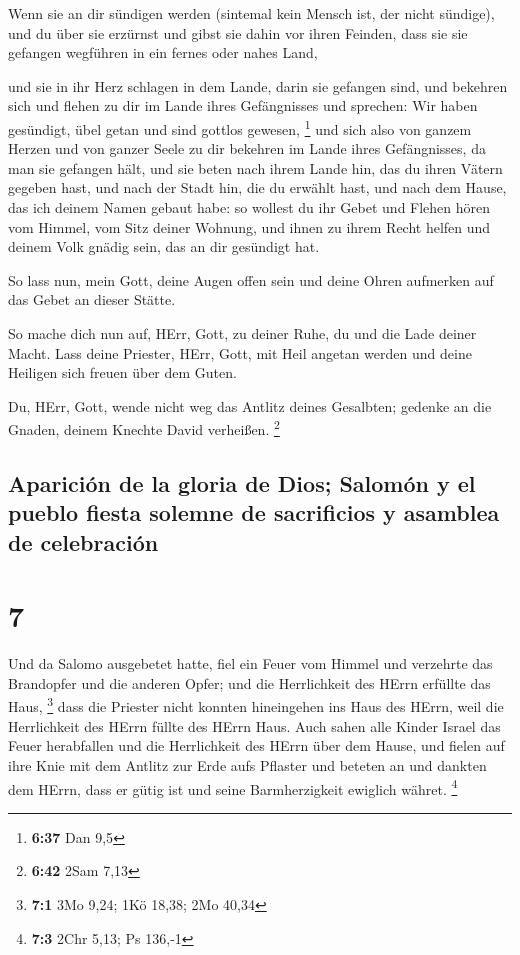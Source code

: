  Wenn sie an dir sündigen werden (sintemal kein Mensch
ist, der nicht sündige), und du über sie erzürnst und gibst sie dahin
vor ihren Feinden, dass sie sie gefangen wegführen in ein fernes oder
nahes Land,

 und sie in ihr Herz schlagen in dem Lande, darin sie
gefangen sind, und bekehren sich und flehen zu dir im Lande ihres
Gefängnisses und sprechen: Wir haben gesündigt, übel getan und sind
gottlos gewesen, \footnote{\textbf{6:37} Dan 9,5}  und
sich also von ganzem Herzen und von ganzer Seele zu dir bekehren im
Lande ihres Gefängnisses, da man sie gefangen hält, und sie beten nach
ihrem Lande hin, das du ihren Vätern gegeben hast, und nach der Stadt
hin, die du erwählt hast, und nach dem Hause, das ich deinem Namen
gebaut habe:  so wollest du ihr Gebet und Flehen hören
vom Himmel, vom Sitz deiner Wohnung, und ihnen zu ihrem Recht helfen und
deinem Volk gnädig sein, das an dir gesündigt hat.

 So lass nun, mein Gott, deine Augen offen sein und deine
Ohren aufmerken auf das Gebet an dieser Stätte.

 So mache dich nun auf, HErr, Gott, zu deiner Ruhe, du
und die Lade deiner Macht. Lass deine Priester, HErr, Gott, mit Heil
angetan werden und deine Heiligen sich freuen über dem Guten.

 Du, HErr, Gott, wende nicht weg das Antlitz deines
Gesalbten; gedenke an die Gnaden, deinem Knechte David verheißen.
\footnote{\textbf{6:42} 2Sam 7,13}

\hypertarget{apariciuxf3n-de-la-gloria-de-dios-salomuxf3n-y-el-pueblo-fiesta-solemne-de-sacrificios-y-asamblea-de-celebraciuxf3n}{%
\subsection{Aparición de la gloria de Dios; Salomón y el pueblo fiesta
solemne de sacrificios y asamblea de
celebración}\label{apariciuxf3n-de-la-gloria-de-dios-salomuxf3n-y-el-pueblo-fiesta-solemne-de-sacrificios-y-asamblea-de-celebraciuxf3n}}

\hypertarget{section-6}{%
\section{7}\label{section-6}}

 Und da Salomo ausgebetet hatte, fiel ein Feuer vom Himmel
und verzehrte das Brandopfer und die anderen Opfer; und die Herrlichkeit
des HErrn erfüllte das Haus, \footnote{\textbf{7:1} 3Mo 9,24; 1Kö 18,38;
  2Mo 40,34}  dass die Priester nicht konnten hineingehen
ins Haus des HErrn, weil die Herrlichkeit des HErrn füllte des HErrn
Haus.  Auch sahen alle Kinder Israel das Feuer herabfallen
und die Herrlichkeit des HErrn über dem Hause, und fielen auf ihre Knie
mit dem Antlitz zur Erde aufs Pflaster und beteten an und dankten dem
HErrn, dass er gütig ist und seine Barmherzigkeit ewiglich währet.
\footnote{\textbf{7:3} 2Chr 5,13; Ps 136,-1}

